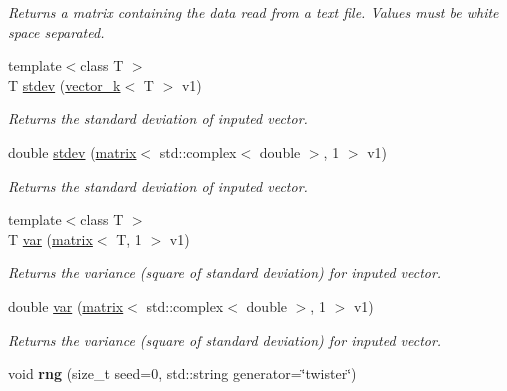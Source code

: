 \begin{DoxyCompactItemize}
\begin{DoxyCompactList}\small\item\em Returns a matrix containing the data read from a text file. Values must be white space separated. \end{DoxyCompactList}\item 
\hypertarget{namespacekeycpp_a61234b7bb0f3126b3db82634675c2951}{{\footnotesize template$<$class T $>$ }\\T \hyperlink{namespacekeycpp_a61234b7bb0f3126b3db82634675c2951}{stdev} (\hyperlink{classkeycpp_1_1vector__k}{vector\-\_\-k}$<$ T $>$ v1)}\label{namespacekeycpp_a61234b7bb0f3126b3db82634675c2951}

\begin{DoxyCompactList}\small\item\em Returns the standard deviation of inputed vector. \end{DoxyCompactList}\item 
\hypertarget{namespacekeycpp_ae21397fe493706b26ad0c82e68e91058}{double \hyperlink{namespacekeycpp_ae21397fe493706b26ad0c82e68e91058}{stdev} (\hyperlink{classkeycpp_1_1matrix}{matrix}$<$ std\-::complex$<$ double $>$, 1 $>$ v1)}\label{namespacekeycpp_ae21397fe493706b26ad0c82e68e91058}

\begin{DoxyCompactList}\small\item\em Returns the standard deviation of inputed vector. \end{DoxyCompactList}\item 
\hypertarget{namespacekeycpp_a79a78447c9dc9548d7a079559fa967b0}{{\footnotesize template$<$class T $>$ }\\T \hyperlink{namespacekeycpp_a79a78447c9dc9548d7a079559fa967b0}{var} (\hyperlink{classkeycpp_1_1matrix}{matrix}$<$ T, 1 $>$ v1)}\label{namespacekeycpp_a79a78447c9dc9548d7a079559fa967b0}

\begin{DoxyCompactList}\small\item\em Returns the variance (square of standard deviation) for inputed vector. \end{DoxyCompactList}\item 
\hypertarget{namespacekeycpp_a8088bf07b8776763ca23a141575e3715}{double \hyperlink{namespacekeycpp_a8088bf07b8776763ca23a141575e3715}{var} (\hyperlink{classkeycpp_1_1matrix}{matrix}$<$ std\-::complex$<$ double $>$, 1 $>$ v1)}\label{namespacekeycpp_a8088bf07b8776763ca23a141575e3715}

\begin{DoxyCompactList}\small\item\em Returns the variance (square of standard deviation) for inputed vector. \end{DoxyCompactList}\item 
\hypertarget{namespacekeycpp_a93e133b94bc27c9b984d0383b01772d4}{void {\bfseries rng} (size\-\_\-t seed=0, std\-::string generator=\char`\"{}twister\char`\"{})}\label{namespacekeycpp_a93e133b94bc27c9b984d0383b01772d4}


\end{DoxyCompactItemize}
